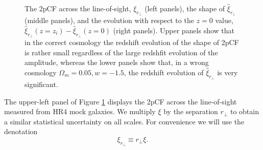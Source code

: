 \documentclass[iop]{emulateapj}
\begin{document}
\begin{figure}
   \caption{\label{fig_diffz}
  The 2pCF across the line-of-sight, $\xi_{r_\perp}$ (left panels), the shape of $\hat{\xi}_{r_\perp}$ (middle panels),
  and the evolution with respect to the $z=0$ value, $\hat{\xi}_{r_{\perp}}(z=z_i) - \hat{\xi}_{r_{\perp}}(z=0)$ (right panels). 
  Upper panels show that in the correct cosmology the redshift evolution of the shape of 2pCF is rather small regardless of the large redshfit evolution of the amplitude, 
  whereas the lower panels show that, in a wrong cosmology $\Omega_m = 0.05,w=-1.5$, the redshift evolution of $\hat{\xi}_{r_\perp}$ is very significant.
   }
\end{figure}

The upper-left panel of Figure \ref{fig_diffz} displays the 2pCF across the line-of-sight measured from HR4 mock galaxies. %
We multiply $\xi$ by the separation $r_\perp$ to obtain a similar statistical uncertainty on all scales.
For convenience we will use the denotation
\begin{equation}
 \xi_{r_{\perp}} \equiv r_{\perp} \xi.
\end{equation}
\end{document}
